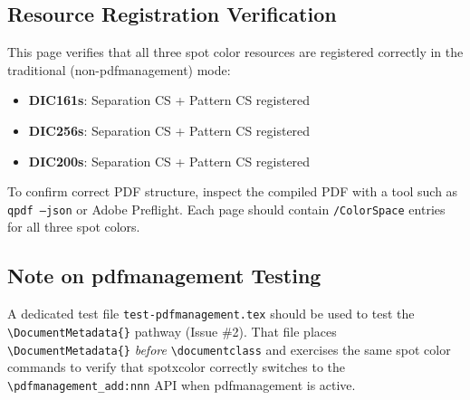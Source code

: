 \documentclass{article}\listfiles\pagestyle{empty}
\newcommand\onelineskip{\par\vspace{\baselineskip}\par}
\begin{document}
\subsection*{Resource Registration Verification}

This page verifies that all three spot color resources are registered correctly
in the traditional (non-pdfmanagement) mode:

\begin{itemize}
  \item \textcolor{DIC161s}{\textbf{DIC161s}}: Separation CS + Pattern CS registered
  \item \textcolor{DIC256s}{\textbf{DIC256s}}: Separation CS + Pattern CS registered
  \item \textcolor{DIC200s}{\textbf{DIC200s}}: Separation CS + Pattern CS registered
\end{itemize}

\onelineskip

To confirm correct PDF structure, inspect the compiled PDF with a tool such as
\texttt{qpdf --json} or Adobe Preflight. Each page should contain
\texttt{/ColorSpace} entries for all three spot colors.

\onelineskip

\subsection*{Note on pdfmanagement Testing}

A dedicated test file \texttt{test-pdfmanagement.tex} should be used to test the
\verb|\DocumentMetadata{}| pathway (Issue \#2). That file places
\verb|\DocumentMetadata{}| \emph{before} \verb|\documentclass| and exercises the
same spot color commands to verify that \textsf{spotxcolor} correctly switches to
the \verb|\pdfmanagement_add:nnn| API when pdfmanagement is active.
\end{document}
